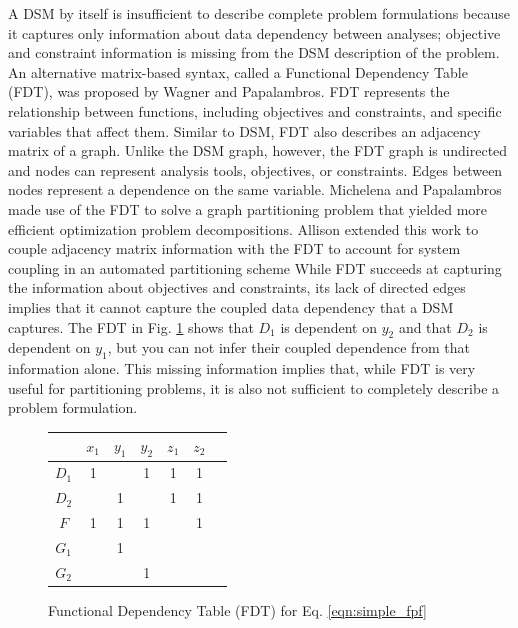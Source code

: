     A DSM by itself is insufficient to describe complete problem formulations because it 
    captures only information about data dependency between analyses; objective and 
    constraint information is missing from the DSM description of the problem. 
    An alternative matrix-based syntax, called a Functional Dependency Table (FDT), was proposed by Wagner and Papalambros. 
    FDT represents the relationship between functions, including objectives and constraints, and specific variables that affect 
    them\cite{Wagner1993}. Similar to DSM, FDT also describes an adjacency matrix of a graph. Unlike the DSM graph, 
    however, the FDT graph is undirected and nodes can represent analysis tools, objectives, 
    or constraints. Edges between nodes represent a dependence on the same 
    variable. Michelena and Papalambros made use of the FDT to solve a graph partitioning problem that yielded 
    more efficient optimization problem decompositions\cite{Michelena1997}. Allison 
    extended this work to couple adjacency matrix information with the FDT to 
    account for system coupling in an automated partitioning scheme\cite{Allison2008} While FDT succeeds at capturing the 
    information about objectives and constraints, its lack of directed edges 
    implies that it cannot capture the coupled data dependency that a DSM captures. 
    The FDT in Fig. \ref{fig:FDT_simple} shows that $D_1$ is dependent on $y_2$ and 
    that $D_2$ is dependent on $y_1$, but you can not infer their coupled dependence from 
    that information alone. This missing information implies 
    that, while FDT is very useful for partitioning problems, it is also not 
    sufficient to completely describe a problem formulation. 

    \begin{figure}[htb!]
        \begin{center}
        \begin{tabular}{|c|c|c|c|c|c|c|}
            \hline
                   & $x_1$ & $y_1$ & $y_2$ & $z_1$ & $z_2$ \\ \hline
            $D_1$  & 1     &       & 1     & 1     & 1     \\ \hline
            $D_2$  &       & 1     &       & 1     & 1     \\ \hline
            $F$    & 1     & 1     & 1     &       & 1     \\ \hline
            $G_1$  &       & 1     &       &       &       \\ \hline
            $G_2$  &       &       & 1     &       &       \\
            \hline
        \end{tabular}
        \caption{Functional Dependency Table (FDT) for Eq. \ref{eqn:simple_fpf} \label{fig:FDT_simple}}
        \end{center}
    \end{figure}

